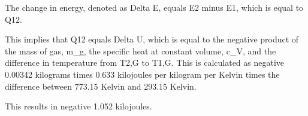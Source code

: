 The change in energy, denoted as Delta E, equals E2 minus E1, which is equal to Q12.

This implies that Q12 equals Delta U, which is equal to the negative product of the mass of gas, m_g, the specific heat at constant volume, c_V, and the difference in temperature from T2,G to T1,G. This is calculated as negative 0.00342 kilograms times 0.633 kilojoules per kilogram per Kelvin times the difference between 773.15 Kelvin and 293.15 Kelvin.

This results in negative 1.052 kilojoules.